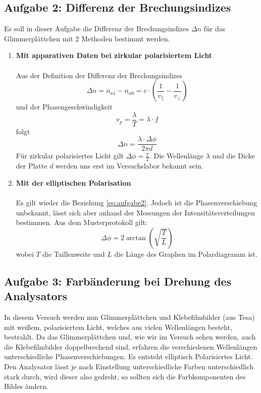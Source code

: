 \documentclass[a4paper,titlepage]{scrartcl}
\numberwithin{equation}{section}
\begin{document}
\subsection{Aufgabe 2: Differenz der Brechungsindizes}
Es soll in dieser Aufgabe die Differenz der Brechungsindizes $\Delta n$ für das Glimmerplättchen mit 2 Methoden bestimmt werden.
\begin{enumerate}
\item \textbf{Mit apparativen Daten bei zirkular polarisiertem Licht}\\ \\
Aus der Definition der Differenz der Brechungsindizes
\begin{equation*}
\Delta n=n_{a1}-n_{a0}=c \cdot (\frac{1}{v_{\parallel}} - \frac{1}{v_{\perp}})
\end{equation*}
und der Phasengeschwindigkeit
\begin{equation*}
v_p=\frac{\lambda}{T}=\lambda \cdot f
\end{equation*}
folgt
\begin{equation}
\label{eq:aufgabe2}
\Delta n=\frac{\lambda \cdot \Delta \phi}{2 \pi d}
\end{equation}
Für zirkular polarisiertes Licht gilt $\Delta \phi=\frac{\pi}{2}$. Die Wellenlänge $\lambda$ und die Dicke der Platte $d$ werden uns erst im Versuchslabor bekannt sein.
\item \textbf{Mit der elliptischen Polarisation}\\ \\
Es gilt wieder die Beziehung \ref{eq:aufgabe2}. Jedoch ist die Phasenverschiebung unbekannt, lässt sich aber anhand der Messungen der Intensitätsverteilungen bestimmen. Aus dem Musterprotokoll \cite{vorbereitung1} gilt:
\begin{equation*}
\Delta \phi = 2 \arctan\left(\sqrt{\frac{T}{L}}\right)
\end{equation*}
wobei $T$ die Taillenweite und $L$ die Länge des Graphen im Polardiagramm ist.
\end{enumerate}
\subsection{Aufgabe 3: Farbänderung bei Drehung des Analysators}
In diesem Versuch werden nun Glimmerplättchen und Klebefilmbilder (aus Tesa) mit weißem, polarisiertem Licht, welches aus vielen Wellenlängen besteht, bestrahlt. Da das Glimmerplättchen und, wie wir im Versuch sehen werden, auch die Klebefilmbilder doppelbrechend sind, erfahren die verschiedenen Wellenlängen unterschiedliche Phasenverschiebungen. Es entsteht elliptisch Polarisiertes Licht. Den Analysator lässt je nach Einstellung unterschiedliche Farben unterschiedlich stark durch, wird dieser also gedreht, so sollten sich die Farbkomponenten des Bildes ändern.
\end{document}
